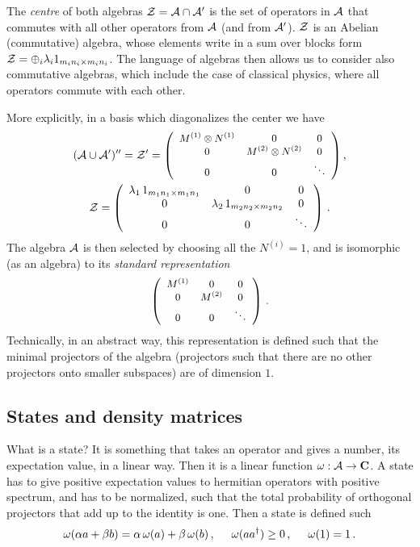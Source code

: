 \documentclass[11pt]{article}
\numberwithin{equation}{section}
\newcommand{\be}{\begin{equation}}
\newcommand{\ee}{\end{equation}}
\begin{document}
The {\sl centre} of both algebras ${\cal Z}={\cal A}\cap {\cal A}'$ is the set of operators in ${\cal A}$ that commutes with all other operators from ${\cal A}$ (and from ${\cal A}'$). ${\cal Z}$ is an Abelian (commutative) algebra, whose elements write in a sum over blocks form ${\cal Z}=\oplus_i \lambda_i 1_{m_i n_i\times m_i n_i}$. The language of algebras then allows us to consider also commutative algebras, which include the case of classical physics, where all operators commute with each other.

More explicitly, in  a basis which diagonalizes the center we have
\begin{multline}
\small \small\small
({\cal A}\cup {\cal A}')''={\cal Z}'=
\left(\begin{array}{ccc}
  M^{(1)}\otimes N^{(1)} & 0 & 0\\
  0 & M^{(2)}\otimes N^{(2)} & 0 \\
  0 & 0 & \ddots
\end{array}\right), \\  {\cal Z}=
\left(\begin{array}{ccc}
  \lambda_1\,1_{m_1 n_1\times m_1 n_1} & 0 & 0 \\
  0 & \lambda_2\, 1_{m_2 n_2\times m_2 n_2} &  0 \\
  0 & 0 & \ddots
\end{array}\right)\,.
\end{multline} 
The algebra ${\cal A}$ is then selected by choosing all the $N^{(i)}=1$, and is isomorphic (as an algebra) to its {\sl standard representation}
\begin{equation}\small
 \left(\begin{array}{ccc}
  M^{(1)} & 0 & 0 \\
  0 & M^{(2)} & 0\\
  0 & 0 & \ddots
\end{array}\right)\,.
\end{equation}
Technically, in an abstract way, this representation is defined such that the minimal projectors of the algebra (projectors such that there are no other projectors onto smaller subspaces) are of dimension $1$.  

\subsection{States and density matrices}

What is a state? It is something that takes an operator and gives a number, its expectation value, in a linear way. Then it is a linear function $\omega: {\cal A}\rightarrow {\mathbf{C}}$. A state has to give positive expectation values to hermitian operators with positive spectrum, and has to be normalized, such that the total probability of orthogonal projectors that add up to the identity is one. Then a state is defined such 
\be
\omega(\alpha a+ \beta b)=\alpha \,\omega(a)+\beta\, \omega(b)\,, \hspace{.5cm} \omega(a a^\dagger)\ge 0\,, \hspace{0.5cm} \omega(1)=1\,. 
\ee 
 
\end{document}
